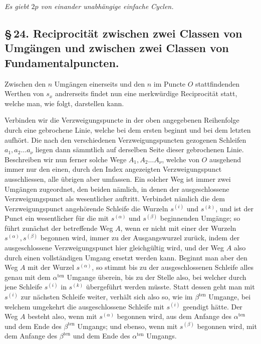 \documentclass[10pt]{article}
\begin{document}
\begin{center}
\emph{Es giebt \(2p\) von einander unabhängige einfache Cyclen.}
\end{center}

\subsection*{\S\,24. Reciprocität zwischen zwei Classen von Umgängen und zwischen zwei Classen von Fundamentalpuncten.}

Zwischen den \(n\) Umgängen einerseits und den \(n\) im Puncte \(O\) stattfindenden Werthen von \(s_x\) andrerseits findet nun eine merkwürdige Reciprocität statt, welche man, wie folgt, darstellen kann.

Verbinden wir die Verzweigungspuncte in der oben angegebenen Reihenfolge durch eine gebrochene Linie, welche bei dem ersten beginnt und bei dem letzten aufhört. Die nach den verschiedenen Verzweigungspuncten gezogenen Schleifen \(a_1,a_2\ldots a_{\nu}\) liegen dann sämmtlich auf derselben Seite dieser gebrochenen Linie. Beschreiben wir nun ferner solche Wege \(A_1,A_2\ldots A_{\nu}\), welche von \(O\) ausgehend immer nur den einen, durch den Index angezeigten Verzweigungspunct ausschliessen, alle übrigen aber umfassen. Ein solcher Weg ist immer zwei Umgängen zugeordnet, den beiden nämlich, in denen der ausgeschlossene Verzweigungspunct als wesentlicher auftritt. Verbindet nämlich die dem Verzweigungspunct angehörende Schleife die Wurzeln \(s^{(i)}\) und \(s^{(k)}\), und ist der Punct ein wesentlicher für die mit \(s^{(\alpha)}\) und \(s^{(\beta)}\) beginnenden Umgänge; so führt zunächst der betreffende Weg \(A\), wenn er nicht mit einer der Wurzeln \(s^{(\alpha)},s^{(\beta)}\) begonnen wird, immer zu der Ausgangswurzel zurück, indem der ausgeschlossene Verzweigungspunct hier gleichgültig wird, und der Weg \(A\) also durch einen vollständigen Umgang ersetzt werden kann. Beginnt man aber den Weg \(A\) mit der Wurzel \(s^{(\alpha)}\), so stimmt bis zu der ausgeschlossenen Schleife alles genau mit dem \(\alpha^{\text{ten}}\) Umgange überein, bis zu der Stelle also, bei welcher durch jene Schleife \(s^{(i)}\) in \(s^{(k)}\) übergeführt werden müsste. Statt dessen geht man mit \(s^{(i)}\) zur nächsten Schleife weiter, verhält sich also so, wie im \(\beta^{\text{ten}}\) Umgange, bei welchem umgekehrt die ausgeschlossene Schleife mit \(s^{(i)}\) geendigt hätte. Der Weg \(A\) besteht also, wenn mit \(s^{(\alpha)}\) begonnen wird, aus dem Anfange des \(\alpha^{\text{ten}}\) und dem Ende des \(\beta^{\text{ten}}\) Umgangs; und ebenso, wenn mit \(s^{(\beta)}\) begonnen wird, mit dem Anfange des \(\beta^{\text{ten}}\) und dem Ende des \(\alpha^{\text{ten}}\) Umgangs.
\end{document}
